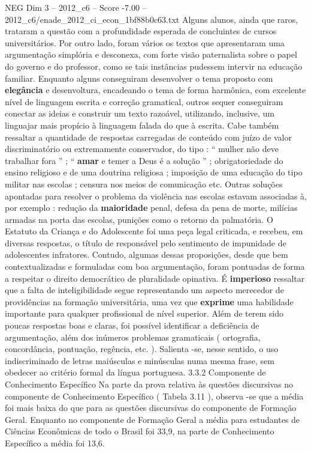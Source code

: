 \begin{textsample}{NEG Dim 3 – 2012\_c6 – Score -7.00 – 2012\_c6/enade\_2012\_ci\_econ\_1bf88b0c63.txt}
Alguns alunos, ainda que raros, trataram a questão com a profundidade esperada de concluintes de cursos universitários.
Por outro lado, foram vários os textos que apresentaram uma argumentação simplória e desconexa, com forte visão paternalista sobre o papel do governo e do professor, como se tais instâncias pudessem intervir na educação familiar.
Enquanto alguns conseguiram desenvolver o tema proposto com \textbf{elegância} e desenvoltura, encadeando o tema de forma harmônica, com excelente nível de linguagem escrita e correção gramatical, outros sequer conseguiram conectar as ideias e construir um texto razoável, utilizando, inclusive, um linguajar mais propício à linguagem falada do que à escrita.
Cabe também ressaltar a quantidade de respostas carregadas de conteúdo com juízo de valor discriminatório ou extremamente conservador, do tipo : “ mulher não deve trabalhar fora ” ; “ \textbf{amar} e temer a Deus é a solução ” ; obrigatoriedade do ensino religioso e de uma doutrina religiosa ; imposição de uma educação do tipo militar nas escolas ; censura nos meios de comunicação etc.
Outras soluções apontadas para resolver o problema da violência nas escolas estavam associadas à, por exemplo : redução da \textbf{maioridade} penal, defesa da pena de morte, milícias armadas na porta das escolas, punições como o retorno da palmatória.
O Estatuto da Criança e do Adolescente foi uma peça legal criticada, e recebeu, em diversas respostas, o título de responsável pelo sentimento de impunidade de adolescentes infratores.
Contudo, algumas dessas proposições, desde que bem contextualizadas e formuladas com boa argumentação, foram pontuadas de forma a respeitar o direito democrático de pluralidade opinativa.
É \textbf{imperioso} ressaltar que a falta de inteligibilidade segue representando um aspecto merecedor de providências na formação universitária, uma vez que \textbf{exprime} uma habilidade importante para qualquer profissional de nível superior.
Além de terem sido poucas respostas boas e claras, foi possível identificar a deficiência de argumentação, além dos inúmeros problemas gramaticais ( ortografia, concordância, pontuação, regência, etc. ).
Salienta -se, nesse sentido, o uso indiscriminado de letras maiúsculas e minúsculas numa mesma frase, sem obedecer ao critério formal da língua portuguesa. 3.3.2 Componente de Conhecimento Específico Na parte da prova relativa às questões discursivas no componente de Conhecimento Específico ( Tabela 3.11 ), observa -se que a média foi mais baixa do que para as questões discursivas do componente de Formação Geral.
Enquanto no componente de Formação Geral a média para estudantes de Ciências Econômicas de todo o Brasil foi 33,9, na parte de Conhecimento Específico a média foi 13,6.

\end{textsample}

